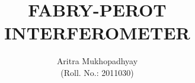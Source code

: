 \documentclass[10pt]{article}
\title{\textbf{FABRY-PEROT INTERFEROMETER}}
\author{Aritra Mukhopadhyay\\(Roll. No.: 2011030)}
\date{}
\begin{document}
    \maketitle
    
    \begin{multicols*}{2}
        
        
        
        
        

        
        
        \nocite{*}
    \end{multicols*}
\end{document}
